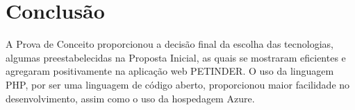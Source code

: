 \chapter{Conclusão}
A Prova de Conceito proporcionou a decisão final da escolha das tecnologias, algumas preestabelecidas na Proposta Inicial, as quais se mostraram eficientes e agregaram positivamente na aplicação web PETINDER. O uso da linguagem PHP, por ser uma linguagem de código aberto, proporcionou maior facilidade no desenvolvimento, assim como o uso da hospedagem Azure. 
